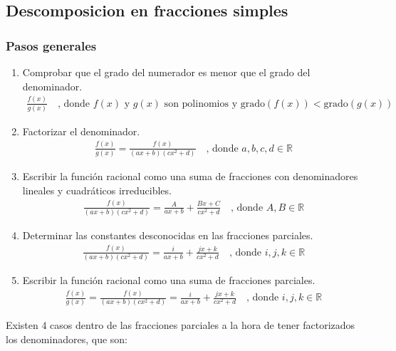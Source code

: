 \documentclass{templateNote}
\begin{document}
\newpage
\subsection{Descomposicion en fracciones simples}
\subsubsection{Pasos generales}
\begin{enumerate}
    \item Comprobar que el grado del numerador es menor que el grado del denominador.
\begin{align*}
    \frac{f(x)}{g(x)} \quad \text{, donde } f(x) \text{ y } g(x) \text{ son polinomios y } \text{grado}(f(x)) < \text{grado}(g(x))
\end{align*}

    \item Factorizar el denominador.
\begin{align*}
    \frac{f(x)}{g(x)} = \frac{f(x)}{(ax+b)(cx^2+d)} \quad \text{, donde } a, b, c, d \in \mathbb{R}
\end{align*}

    \item Escribir la función racional como una suma de fracciones con denominadores lineales y cuadráticos irreducibles.
\begin{align*}
    \frac{f(x)}{(ax+b)(cx^2+d)} = \frac{A}{ax+b} + \frac{Bx+C}{cx^2+d} \quad \text{, donde } A, B \in \mathbb{R}
\end{align*}

    \item Determinar las constantes desconocidas en las fracciones parciales.
\begin{align*}
    \frac{f(x)}{(ax+b)(cx^2+d)} = \frac{i}{ax+b} + \frac{jx + k}{cx^2+d} \quad \text{, donde } i, j, k \in \mathbb{R}
\end{align*}

    \item Escribir la función racional como una suma de fracciones parciales.
\begin{align*}
    \frac{f(x)}{g(x)} = \frac{f(x)}{(ax+b)(cx^2+d)} = \frac{i}{ax+b} + \frac{jx+k}{cx^2+d} \quad \text{, donde } i, j, k \in \mathbb{R}
\end{align*}

\end{enumerate}

Existen 4 casos dentro de las fracciones parciales a la hora de tener factorizados los denominadores, que son:
\end{document}
